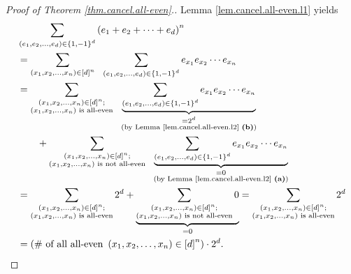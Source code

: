 \begin{proof}
[Proof of Theorem \ref{thm.cancel.all-even}.]Lemma
\ref{lem.cancel.all-even.l1} yields%
\begin{align}
&  \sum_{\left(  e_{1},e_{2},\ldots,e_{d}\right)  \in\left\{  1,-1\right\}
^{d}}\left(  e_{1}+e_{2}+\cdots+e_{d}\right)  ^{n}\nonumber\\
&  =\sum_{\left(  x_{1},x_{2},\ldots,x_{n}\right)  \in\left[  d\right]  ^{n}%
}\ \ \sum_{\left(  e_{1},e_{2},\ldots,e_{d}\right)  \in\left\{  1,-1\right\}
^{d}}e_{x_{1}}e_{x_{2}}\cdots e_{x_{n}}\nonumber\\
&  =\sum_{\substack{\left(  x_{1},x_{2},\ldots,x_{n}\right)  \in\left[
d\right]  ^{n};\\\left(  x_{1},x_{2},\ldots,x_{n}\right)  \text{ is all-even}%
}}\ \ \underbrace{\sum_{\left(  e_{1},e_{2},\ldots,e_{d}\right)  \in\left\{
1,-1\right\}  ^{d}}e_{x_{1}}e_{x_{2}}\cdots e_{x_{n}}}_{\substack{=2^{d}%
\\\text{(by Lemma \ref{lem.cancel.all-even.l2} \textbf{(b)})}}}\nonumber\\
&  \qquad+\sum_{\substack{\left(  x_{1},x_{2},\ldots,x_{n}\right)  \in\left[
d\right]  ^{n};\\\left(  x_{1},x_{2},\ldots,x_{n}\right)  \text{ is not
all-even}}}\ \ \underbrace{\sum_{\left(  e_{1},e_{2},\ldots,e_{d}\right)
\in\left\{  1,-1\right\}  ^{d}}e_{x_{1}}e_{x_{2}}\cdots e_{x_{n}}%
}_{\substack{=0\\\text{(by Lemma \ref{lem.cancel.all-even.l2} \textbf{(a)})}%
}}\nonumber\\
&  =\sum_{\substack{\left(  x_{1},x_{2},\ldots,x_{n}\right)  \in\left[
d\right]  ^{n};\\\left(  x_{1},x_{2},\ldots,x_{n}\right)  \text{ is all-even}%
}}2^{d}+\underbrace{\sum_{\substack{\left(  x_{1},x_{2},\ldots,x_{n}\right)
\in\left[  d\right]  ^{n};\\\left(  x_{1},x_{2},\ldots,x_{n}\right)  \text{ is
not all-even}}}0}_{=0}=\sum_{\substack{\left(  x_{1},x_{2},\ldots
,x_{n}\right)  \in\left[  d\right]  ^{n};\\\left(  x_{1},x_{2},\ldots
,x_{n}\right)  \text{ is all-even}}}2^{d}\nonumber\\
&  =\left(  \text{\# of all all-even }\left(  x_{1},x_{2},\ldots,x_{n}\right)
\in\left[  d\right]  ^{n}\right)  \cdot2^{d}.
\label{sol.count.all-even-tups.c1.pf.b.lhs}%
\end{align}



\end{proof}

